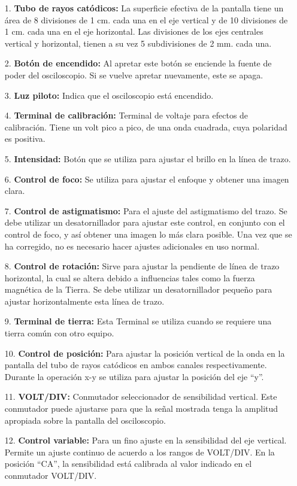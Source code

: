 \documentclass{report}
\begin{document}
\begin{itemize}
\item[1.] \textbf{Tubo de rayos catódicos:} La superficie efectiva de la pantalla tiene un área de 8 divisiones de 1 cm. cada una en el eje vertical y de 10 divisiones de 1 cm. cada una en el eje horizontal. Las divisiones de los ejes centrales vertical y horizontal, tienen a su vez 5 subdivisiones de 2 mm. cada una.
\item[2.] \textbf{Botón de encendido:} Al apretar este botón se enciende la fuente de poder del osciloscopio. Si se vuelve apretar nuevamente, este se apaga.
\item[3.] \textbf{Luz piloto:} Indica que el osciloscopio está encendido.
\item[4.] \textbf{Terminal de calibración:} Terminal de voltaje para efectos de calibración. Tiene un volt pico a pico, de una onda cuadrada, cuya polaridad es positiva.
\item[5.] \textbf{Intensidad:} Botón que se utiliza para ajustar el brillo en la línea de trazo.
\item[6.] \textbf{Control de foco:} Se utiliza para ajustar el enfoque y obtener una imagen clara.
\item[7.] \textbf{Control de astigmatismo:} Para el ajuste del astigmatismo del trazo. Se debe utilizar un
desatornillador para ajustar este control, en conjunto con el control de
foco, y así obtener una imagen lo más clara posible. Una vez que se ha
corregido, no es necesario hacer ajustes adicionales en uso normal.
\item[8.] \textbf{Control de rotación:} Sirve para ajustar la pendiente de línea de trazo horizontal, la cual se altera debido a influencias tales como la fuerza magnética de la Tierra. Se debe utilizar un desatornillador pequeño para ajustar horizontalmente esta línea de trazo.
\item[9.] \textbf{Terminal de tierra:} Esta Terminal se utiliza cuando se requiere una tierra común con otro equipo.
\item[10.] \textbf{Control de posición:} Para ajustar la posición vertical de la onda en la pantalla del tubo de rayos catódicos en ambos canales respectivamente. Durante la operación x-y se utiliza para ajustar la posición del eje ``y''.
\item[11.] \textbf{VOLT/DIV:} Conmutador seleccionador de sensibilidad vertical. Este conmutador puede ajustarse para que la señal mostrada tenga la amplitud apropiada sobre la pantalla del osciloscopio.
\item[12.] \textbf{Control variable:} Para un fino ajuste en la sensibilidad del eje vertical. Permite un ajuste continuo de acuerdo a los rangos de VOLT/DIV. En la posición ``CA'', la sensibilidad está calibrada al valor indicado en el conmutador VOLT/DIV.

\end{itemize}
\end{document}
